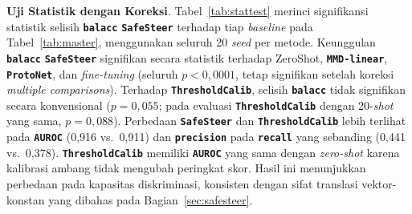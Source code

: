 \documentclass[conference]{IEEEtran}
\newcommand{\nama}[1]{\textbf{\texttt{#1}}}
\newcommand{\myparagraph}[1]{\vspace{0.2cm}\noindent\textbf{#1}.}
\begin{document}
\myparagraph{Uji Statistik dengan Koreksi}
Tabel~\ref{tab:stattest} merinci signifikansi statistik selisih \nama{balacc} \nama{SafeSteer} terhadap tiap \textit{baseline} pada Tabel~\ref{tab:master}, menggunakan seluruh 20 \textit{seed} per metode.
Keunggulan \nama{balacc} \nama{SafeSteer} signifikan secara statistik terhadap ZeroShot, \nama{MMD-linear}, \nama{ProtoNet}, dan \textit{fine-tuning} (seluruh $p<0{,}0001$, tetap signifikan setelah koreksi \textit{multiple comparisons}). Terhadap \nama{ThresholdCalib}, selisih \nama{balacc} tidak signifikan secara konvensional ($p=0{,}055$; pada evaluasi \nama{ThresholdCalib} dengan 20-\textit{shot} yang sama, $p=0{,}088$). Perbedaan \nama{SafeSteer} dan \nama{ThresholdCalib} lebih terlihat pada \nama{AUROC} (0,916 vs.\ 0,911) dan \nama{precision} pada \nama{recall} yang sebanding (0,441 vs.\ 0,378). \nama{ThresholdCalib} memiliki \nama{AUROC} yang sama dengan \textit{zero-shot} karena kalibrasi ambang tidak mengubah peringkat skor. Hasil ini menunjukkan perbedaan pada kapasitas diskriminasi, konsisten dengan sifat translasi vektor-konstan yang dibahas pada Bagian~\ref{sec:safesteer}.
\end{document}
